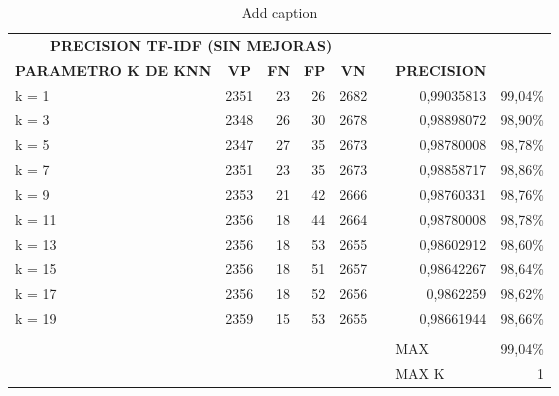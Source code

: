 \documentclass{article}
\begin{document}
\begin{table}[htbp]
  \centering
  \caption{Add caption}
    \begin{tabular}{rrrrrrlr}
    \multicolumn{5}{c}{\textbf{PRECISION TF-IDF (SIN MEJORAS)}} &       &       &  \\
    \multicolumn{1}{c}{\textbf{PARAMETRO K DE KNN}} & \multicolumn{1}{c}{\textbf{VP}} & \multicolumn{1}{c}{\textbf{FN}} & \multicolumn{1}{c}{\textbf{FP}} & \multicolumn{1}{c}{\textbf{VN}} &       & \textbf{PRECISION} &  \\
    \multicolumn{1}{l}{k = 1} & 2351  & 23    & 26    & 2682  &       & \multicolumn{1}{r}{0,99035813} & 99,04\% \\
    \multicolumn{1}{l}{k = 3} & 2348  & 26    & 30    & 2678  &       & \multicolumn{1}{r}{0,98898072} & 98,90\% \\
    \multicolumn{1}{l}{k = 5} & 2347  & 27    & 35    & 2673  &       & \multicolumn{1}{r}{0,98780008} & 98,78\% \\
    \multicolumn{1}{l}{k = 7} & 2351  & 23    & 35    & 2673  &       & \multicolumn{1}{r}{0,98858717} & 98,86\% \\
    \multicolumn{1}{l}{k = 9} & 2353  & 21    & 42    & 2666  &       & \multicolumn{1}{r}{0,98760331} & 98,76\% \\
    \multicolumn{1}{l}{k = 11} & 2356  & 18    & 44    & 2664  &       & \multicolumn{1}{r}{0,98780008} & 98,78\% \\
    \multicolumn{1}{l}{k = 13} & 2356  & 18    & 53    & 2655  &       & \multicolumn{1}{r}{0,98602912} & 98,60\% \\
    \multicolumn{1}{l}{k = 15} & 2356  & 18    & 51    & 2657  &       & \multicolumn{1}{r}{0,98642267} & 98,64\% \\
    \multicolumn{1}{l}{k = 17} & 2356  & 18    & 52    & 2656  &       & \multicolumn{1}{r}{0,9862259} & 98,62\% \\
    \multicolumn{1}{l}{k = 19} & 2359  & 15    & 53    & 2655  &       & \multicolumn{1}{r}{0,98661944} & 98,66\% \\
          &       &       &       &       &       &       &  \\
          &       &       &       &       &       & MAX   & 99,04\% \\
          &       &       &       &       &       & MAX K & 1 \\
    \end{tabular}%
  \label{tab:addlabel}%
\end{table}%
\end{document}
